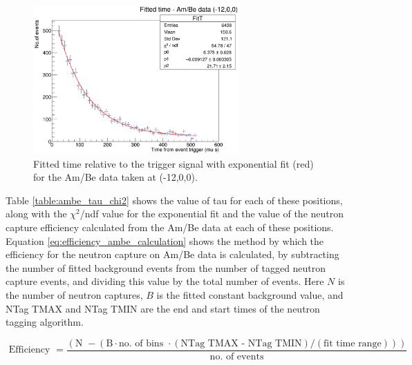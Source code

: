 \begin{figure}
    \centering
    \includegraphics[width=0.7\textwidth]{Figures/ambe_data_-12x.png}
    \caption{Fitted time relative to the trigger signal with exponential fit (red) for the Am/Be data taken at (-12,0,0).}
    \label{fig:ambe_-12}
\end{figure}

Table \ref{table:ambe_tau_chi2} shows the value of tau for each of these positions, along with the $\chi^{2}$/ndf value for the exponential fit and the value of the neutron capture efficiency calculated from the Am/Be data at each of these positions. Equation \ref{eq:efficiency_ambe_calculation} shows the method by which the efficiency for the neutron capture on Am/Be data is calculated, by subtracting the number of fitted background events from the number of tagged neutron capture events, and dividing this value by the total number of events. Here $N$ is the number of neutron captures, $B$ is the fitted constant background value, and NTag TMAX and NTag TMIN are the end and start times of the neutron tagging algorithm.   





\begin{equation}
    \text { Efficiency }=\frac{(\text {N } - (\text{B} \cdot \text {no. of bins }  \cdot (\text{NTag TMAX - NTag TMIN}) / (\text{fit time range})))  }{\text { no. of events }}
    \label{eq:efficiency_ambe_calculation}
\end{equation}

